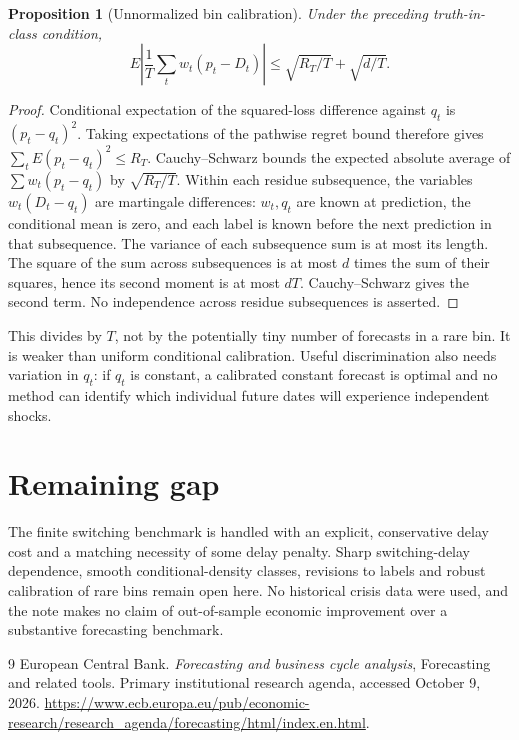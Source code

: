 \documentclass[11pt]{article}
\newtheorem{proposition}[theorem]{Proposition}
\theoremstyle{remark}
\begin{document}
\begin{proposition}[Unnormalized bin calibration]
Under the preceding truth-in-class condition,
\[
 E\left|\frac1T\sum_tw_t(p_t-D_t)\right|
 \le\sqrt{R_T/T}+\sqrt{d/T}.
\]
\end{proposition}
\begin{proof}
Conditional expectation of the squared-loss difference against $q_t$ is $(p_t-q_t)^2$. Taking expectations of the pathwise regret bound therefore gives $\sum_tE(p_t-q_t)^2\le R_T$. Cauchy--Schwarz bounds the expected absolute average of $\sum w_t(p_t-q_t)$ by $\sqrt{R_T/T}$.
Within each residue subsequence, the variables $w_t(D_t-q_t)$ are martingale differences: $w_t,q_t$ are known at prediction, the conditional mean is zero, and each label is known before the next prediction in that subsequence. The variance of each subsequence sum is at most its length. The square of the sum across subsequences is at most $d$ times the sum of their squares, hence its second moment is at most $dT$. Cauchy--Schwarz gives the second term. No independence across residue subsequences is asserted.
\end{proof}
This divides by $T$, not by the potentially tiny number of forecasts in a rare bin. It is weaker than uniform conditional calibration. Useful discrimination also needs variation in $q_t$: if $q_t$ is constant, a calibrated constant forecast is optimal and no method can identify which individual future dates will experience independent shocks.

\section*{Remaining gap}
The finite switching benchmark is handled with an explicit, conservative delay cost and a matching necessity of some delay penalty. Sharp switching-delay dependence, smooth conditional-density classes, revisions to labels and robust calibration of rare bins remain open here. No historical crisis data were used, and the note makes no claim of out-of-sample economic improvement over a substantive forecasting benchmark.

\begin{thebibliography}{9}
 European Central Bank. \emph{Forecasting and business cycle analysis}, Forecasting and related tools. Primary institutional research agenda, accessed October 9, 2026. \url{https://www.ecb.europa.eu/pub/economic-research/research_agenda/forecasting/html/index.en.html}.
\end{thebibliography}
\end{document}
